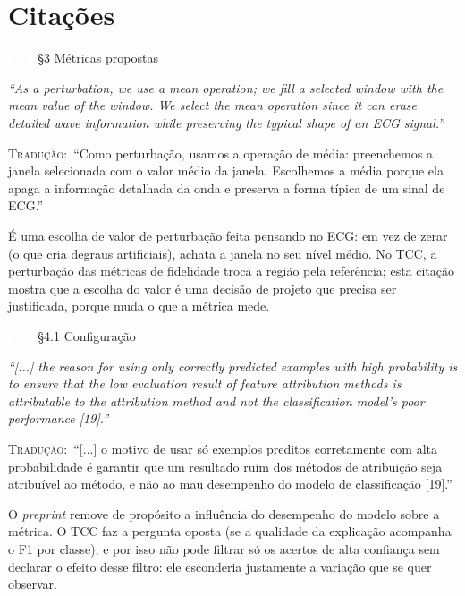 \documentclass[11pt,a4paper]{article}
\newcommand{\pagechip}[1]{{\setlength{\fboxsep}{1.5pt}\colorbox{cAcc}{\textcolor{white}{\scriptsize\texttt{#1}}}}}
\newenvironment{origquote}{\par\itshape\small}{\par}
\newenvironment{tradquote}{\par\small\textsc{Tradução:}\ }{\par}
\newcommand{\explab}[1]{\par\smallskip{\small\color{cAcc}\textbf{\MakeUppercase{#1}}}\par}
\begin{document}
\section{Citações}

\begin{citacard}{\pagechip{p. 3} §3 Métricas propostas}
\begin{origquote}“As a perturbation, we use a mean operation; we fill a selected window with the mean value of the window. We select the mean operation since it can erase detailed wave information while preserving the typical shape of an ECG signal.”\end{origquote}
\begin{tradquote}“Como perturbação, usamos a operação de média: preenchemos a janela selecionada com o valor médio da janela. Escolhemos a média porque ela apaga a informação detalhada da onda e preserva a forma típica de um sinal de ECG.”\end{tradquote}
\explab{Explicação}
É uma escolha de valor de perturbação feita pensando no ECG: em vez de zerar (o que cria degraus artificiais), achata a janela no seu nível médio. No TCC, a perturbação das métricas de fidelidade troca a região pela referência; esta citação mostra que a escolha do valor é uma decisão de projeto que precisa ser justificada, porque muda o que a métrica mede.
\end{citacard}

\begin{citacard}{\pagechip{p. 3} §4.1 Configuração}
\begin{origquote}“[...] the reason for using only correctly predicted examples with high probability is to ensure that the low evaluation result of feature attribution methods is attributable to the attribution method and not the classification model’s poor performance [19].”\end{origquote}
\begin{tradquote}“[...] o motivo de usar só exemplos preditos corretamente com alta probabilidade é garantir que um resultado ruim dos métodos de atribuição seja atribuível ao método, e não ao mau desempenho do modelo de classificação [19].”\end{tradquote}
\explab{Explicação}
O \textit{preprint} remove de propósito a influência do desempenho do modelo sobre a métrica. O TCC faz a pergunta oposta (se a qualidade da explicação acompanha o F1 por classe), e por isso não pode filtrar só os acertos de alta confiança sem declarar o efeito desse filtro: ele esconderia justamente a variação que se quer observar.
\end{citacard}
\end{document}
